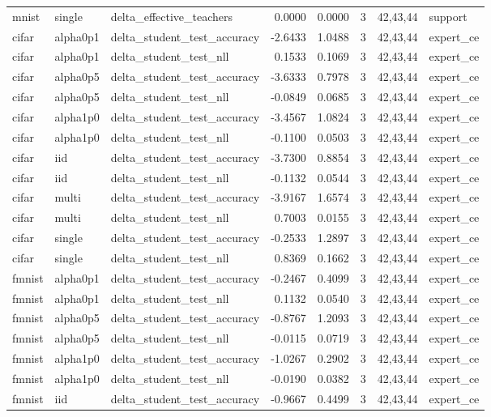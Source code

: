 \begin{tabular}{lllrrrll}
mnist & single & delta\_effective\_teachers & 0.0000 & 0.0000 & 3 & 42,43,44 & support \\
cifar & alpha0p1 & delta\_student\_test\_accuracy & -2.6433 & 1.0488 & 3 & 42,43,44 & expert\_ce \\
cifar & alpha0p1 & delta\_student\_test\_nll & 0.1533 & 0.1069 & 3 & 42,43,44 & expert\_ce \\
cifar & alpha0p5 & delta\_student\_test\_accuracy & -3.6333 & 0.7978 & 3 & 42,43,44 & expert\_ce \\
cifar & alpha0p5 & delta\_student\_test\_nll & -0.0849 & 0.0685 & 3 & 42,43,44 & expert\_ce \\
cifar & alpha1p0 & delta\_student\_test\_accuracy & -3.4567 & 1.0824 & 3 & 42,43,44 & expert\_ce \\
cifar & alpha1p0 & delta\_student\_test\_nll & -0.1100 & 0.0503 & 3 & 42,43,44 & expert\_ce \\
cifar & iid & delta\_student\_test\_accuracy & -3.7300 & 0.8854 & 3 & 42,43,44 & expert\_ce \\
cifar & iid & delta\_student\_test\_nll & -0.1132 & 0.0544 & 3 & 42,43,44 & expert\_ce \\
cifar & multi & delta\_student\_test\_accuracy & -3.9167 & 1.6574 & 3 & 42,43,44 & expert\_ce \\
cifar & multi & delta\_student\_test\_nll & 0.7003 & 0.0155 & 3 & 42,43,44 & expert\_ce \\
cifar & single & delta\_student\_test\_accuracy & -0.2533 & 1.2897 & 3 & 42,43,44 & expert\_ce \\
cifar & single & delta\_student\_test\_nll & 0.8369 & 0.1662 & 3 & 42,43,44 & expert\_ce \\
fmnist & alpha0p1 & delta\_student\_test\_accuracy & -0.2467 & 0.4099 & 3 & 42,43,44 & expert\_ce \\
fmnist & alpha0p1 & delta\_student\_test\_nll & 0.1132 & 0.0540 & 3 & 42,43,44 & expert\_ce \\
fmnist & alpha0p5 & delta\_student\_test\_accuracy & -0.8767 & 1.2093 & 3 & 42,43,44 & expert\_ce \\
fmnist & alpha0p5 & delta\_student\_test\_nll & -0.0115 & 0.0719 & 3 & 42,43,44 & expert\_ce \\
fmnist & alpha1p0 & delta\_student\_test\_accuracy & -1.0267 & 0.2902 & 3 & 42,43,44 & expert\_ce \\
fmnist & alpha1p0 & delta\_student\_test\_nll & -0.0190 & 0.0382 & 3 & 42,43,44 & expert\_ce \\
fmnist & iid & delta\_student\_test\_accuracy & -0.9667 & 0.4499 & 3 & 42,43,44 & expert\_ce \\

\end{tabular}
